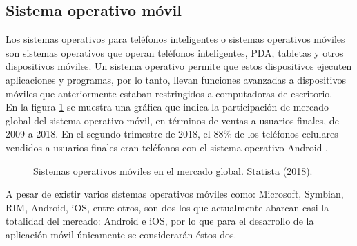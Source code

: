 
\subsection{Sistema operativo móvil}
Los sistemas operativos para teléfonos inteligentes o sistemas operativos móviles son sistemas operativos que operan teléfonos inteligentes, PDA, tabletas y otros dispositivos móviles. Un sistema operativo permite que estos dispositivos ejecuten aplicaciones y programas, por lo tanto, llevan funciones avanzadas a dispositivos móviles que anteriormente estaban restringidos a computadoras de escritorio. \\

En la figura \ref{fig:grafica_mercadoOS} se muestra una gráfica que indica la participación de mercado global del sistema operativo móvil, en términos de ventas a usuarios finales, de 2009 a 2018. En el segundo trimestre de 2018, el 88\% de los teléfonos celulares vendidos a usuarios finales eran teléfonos con el sistema operativo Android \cite{mercadoOS}. \\

\begin{figure}[htbp!]
	\centering
	\caption{Sistemas operativos móviles en el mercado global. Statista (2018).}
	\label{fig:grafica_mercadoOS}
\end{figure}

A pesar de existir varios sistemas operativos móviles como: Microsoft, Symbian, RIM, Android, iOS, entre otros, son dos los que actualmente abarcan casi la totalidad del mercado: Android e iOS, por lo que para el desarrollo de la aplicación móvil únicamente se considerarán éstos dos. \\


